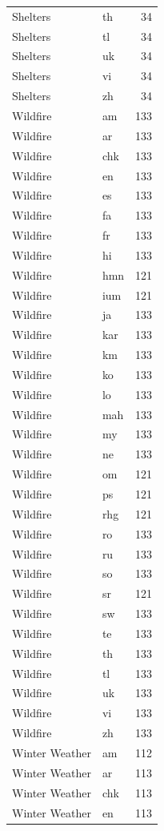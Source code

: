 \begin{longtable}{p{3cm} p{3cm} r}
Shelters & th & 34 \\
Shelters & tl & 34 \\
Shelters & uk & 34 \\
Shelters & vi & 34 \\
Shelters & zh & 34 \\
Wildfire & am & 133 \\
Wildfire & ar & 133 \\
Wildfire & chk & 133 \\
Wildfire & en & 133 \\
Wildfire & es & 133 \\
Wildfire & fa & 133 \\
Wildfire & fr & 133 \\
Wildfire & hi & 133 \\
Wildfire & hmn & 121 \\
Wildfire & ium & 121 \\
Wildfire & ja & 133 \\
Wildfire & kar & 133 \\
Wildfire & km & 133 \\
Wildfire & ko & 133 \\
Wildfire & lo & 133 \\
Wildfire & mah & 133 \\
Wildfire & my & 133 \\
Wildfire & ne & 133 \\
Wildfire & om & 121 \\
Wildfire & ps & 121 \\
Wildfire & rhg & 121 \\
Wildfire & ro & 133 \\
Wildfire & ru & 133 \\
Wildfire & so & 133 \\
Wildfire & sr & 121 \\
Wildfire & sw & 133 \\
Wildfire & te & 133 \\
Wildfire & th & 133 \\
Wildfire & tl & 133 \\
Wildfire & uk & 133 \\
Wildfire & vi & 133 \\
Wildfire & zh & 133 \\
Winter Weather & am & 112 \\
Winter Weather & ar & 113 \\
Winter Weather & chk & 113 \\
Winter Weather & en & 113 \\

\end{longtable}
